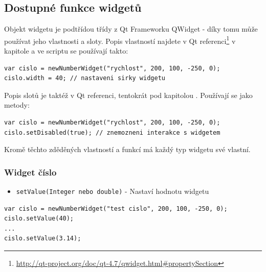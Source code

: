\documentclass[12pt, a4paper, oneside]{article}
\newcommand{\It}{\textit}  %
\begin{document}
\subsection*{Dostupné funkce widgetů}
Objekt widgetu je podtřídou třídy z Qt Frameworku QWidget - díky tomu může používat jeho vlastnosti a sloty. Popis vlastností najdete v Qt referenci\footnote{\url{http://qt-project.org/doc/qt-4.7/qwidget.html#propertySection}} v kapitole  a ve scriptu se používají takto:

\noindent\begin{minipage}{\textwidth}
\begin{lstlisting}[caption=Vytvoření widgetu \It{číslo} a nastaveni vlastnosti \uv{width}]
var cislo = newNumberWidget("rychlost", 200, 100, -250, 0);
cislo.width = 40; // nastaveni sirky widgetu
\end{lstlisting}
\end{minipage}

Popis slotů je taktéž v Qt referenci, tentokrát pod kapitolou . Používají se jako metody:

\noindent\begin{minipage}{\textwidth}
\begin{lstlisting}[caption=Vytvoření widgetu \It{číslo} a použití slotu]
var cislo = newNumberWidget("rychlost", 200, 100, -250, 0);
cislo.setDisabled(true); // znemozneni interakce s widgetem
\end{lstlisting}
\end{minipage}

Kromě těchto zděděných vlastností a funkcí má každý typ widgetu své vlastní.

\newpage
\subsubsection*{Widget číslo}
\begin{itemize}
    \item {\color{blue}\verb/setValue(Integer nebo double)/} - Nastaví hodnotu widgetu
\end{itemize}

\noindent\begin{minipage}{\textwidth}
\begin{lstlisting}[caption=Nastavení hodnoty widgetu \It{číslo}]
var cislo = newNumberWidget("test cislo", 200, 100, -250, 0);
cislo.setValue(40);
...
cislo.setValue(3.14);
\end{lstlisting}
\end{minipage}
\end{document}
